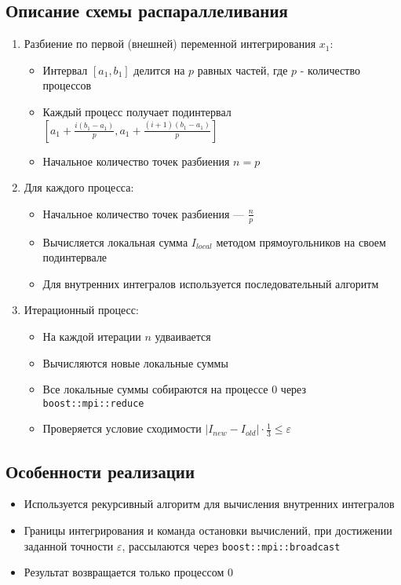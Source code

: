 \documentclass[12pt]{article}
\begin{document}
\subsection{Описание схемы распараллеливания}
\begin{enumerate}
    \item Разбиение по первой (внешней) переменной интегрирования $x_1$:
    \begin{itemize}
        \item Интервал $[a_1, b_1]$ делится на $p$ равных частей, где $p$ - количество процессов
        \item Каждый процесс получает подинтервал $[a_1 + \frac{i(b_1-a_1)}{p}, a_1 + \frac{(i+1)(b_1-a_1)}{p}]$
        \item Начальное количество точек разбиения $n = p$ 
    \end{itemize}

    \item Для каждого процесса:
    \begin{itemize}
        \item Начальное количество точек разбиения --- $\frac{n}{p}$ 
        \item Вычисляется локальная сумма $I_{local}$ методом прямоугольников на своем подинтервале
        \item Для внутренних интегралов используется последовательный алгоритм
    \end{itemize}

    \item Итерационный процесс:
    \begin{itemize}
        \item На каждой итерации $n$ удваивается
        \item Вычисляются новые локальные суммы
        \item Все локальные суммы собираются на процессе 0 через \texttt{boost::mpi::reduce}
        \item Проверяется условие сходимости $|I_{new} - I_{old}| \cdot \frac{1}{3} \leq \varepsilon$
    \end{itemize}
\end{enumerate}

\subsection{Особенности реализации}
\begin{itemize}
    \item Используется рекурсивный алгоритм для вычисления внутренних интегралов
    \item Границы интегрирования и команда остановки вычислений, при достижении заданной точности $\varepsilon$, рассылаются через \texttt{boost::mpi::broadcast}
    \item Результат возвращается только процессом 0
\end{itemize}
\end{document}
